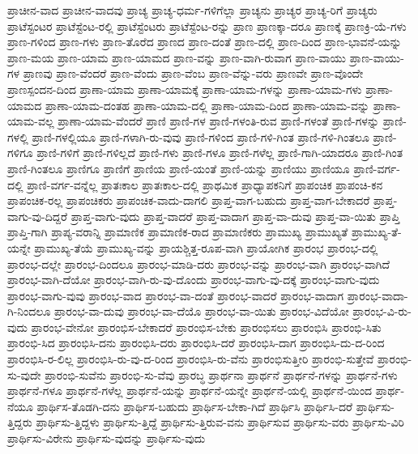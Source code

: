 {ಪ್ರಾಚೀನ-ವಾದ
ಪ್ರಾಚೀನ-ವಾದವು
ಪ್ರಾಚ್ಯ
ಪ್ರಾಚ್ಯ-ಧರ್ಮ-ಗಳಿಗೆಲ್ಲಾ
ಪ್ರಾಚ್ಯನು
ಪ್ರಾಚ್ಯರ
ಪ್ರಾಚ್ಯ-ರಿಗೆ
ಪ್ರಾಚ್ಯರು
ಪ್ರಾಟೆಸ್ಟಂಟರ
ಪ್ರಾಟೆಸ್ಟೆಂಟ-ರಲ್ಲಿ
ಪ್ರಾಟೆಸ್ಟೆಂಟರು
ಪ್ರಾಟೆಸ್ಟೆಂಟ-ರನ್ನು
ಪ್ರಾಣ
ಪ್ರಾಣಕ್ಕಾ-ದರೂ
ಪ್ರಾಣಕ್ಕೆ
ಪ್ರಾಣಕ್ರಿ-ಯೆ-ಗಳು
ಪ್ರಾಣ-ಗಳಿಂದ
ಪ್ರಾಣ-ಗಳು
ಪ್ರಾಣ-ತೊರೆದ
ಪ್ರಾಣದ
ಪ್ರಾಣ-ದಂತೆ
ಪ್ರಾಣ-ದಲ್ಲಿ
ಪ್ರಾಣ-ದಿಂದ
ಪ್ರಾಣ-ಭಾವನೆ-ಯನ್ನು
ಪ್ರಾಣ-ಮಯ
ಪ್ರಾಣ-ಯಾಮ
ಪ್ರಾಣ-ಯಾಮದ
ಪ್ರಾಣ-ವನ್ನು
ಪ್ರಾಣ-ವಾಗಿ-ರುವಾಗ
ಪ್ರಾಣ-ವಾಯು
ಪ್ರಾಣ-ವಾಯು-ಗಳ
ಪ್ರಾಣವು
ಪ್ರಾಣ-ವೆಂದರೆ
ಪ್ರಾಣ-ವೆಂದು
ಪ್ರಾಣ-ವೆಂಬ
ಪ್ರಾಣ-ವೆನ್ನು-ವರು
ಪ್ರಾಣವೇ
ಪ್ರಾಣ-ವೊಂದೇ
ಪ್ರಾಣಸ್ಪಂದನ-ದಿಂದ
ಪ್ರಾಣಾ-ಯಾಮ
ಪ್ರಾಣಾ-ಯಾಮಕ್ಕೆ
ಪ್ರಾಣಾ-ಯಾಮ-ಗಳನ್ನು
ಪ್ರಾಣಾ-ಯಾಮ-ಗಳು
ಪ್ರಾಣಾ-ಯಾಮದ
ಪ್ರಾಣಾ-ಯಾಮ-ದಂತಹ
ಪ್ರಾಣಾ-ಯಾಮ-ದಲ್ಲಿ
ಪ್ರಾಣಾ-ಯಾಮ-ದಿಂದ
ಪ್ರಾಣಾ-ಯಾಮ-ವನ್ನು
ಪ್ರಾಣಾ-ಯಾಮ-ವಲ್ಲ
ಪ್ರಾಣಾ-ಯಾಮ-ವೆಂದರೆ
ಪ್ರಾಣಿ
ಪ್ರಾಣಿ-ಗಳ
ಪ್ರಾಣಿ-ಗಳಂತಿ-ರುವ
ಪ್ರಾಣಿ-ಗಳಂತೆ
ಪ್ರಾಣಿ-ಗಳನ್ನು
ಪ್ರಾಣಿ-ಗಳಲ್ಲಿ
ಪ್ರಾಣಿ-ಗಳಲ್ಲಿಯೂ
ಪ್ರಾಣಿ-ಗಳಾಗಿ-ರು-ವುವು
ಪ್ರಾಣಿ-ಗಳಿಂದ
ಪ್ರಾಣಿ-ಗಳಿ-ಗಿಂತ
ಪ್ರಾಣಿ-ಗಳಿ-ಗಿಂತಲೂ
ಪ್ರಾಣಿ-ಗಳಿಗೂ
ಪ್ರಾಣಿ-ಗಳಿಗೆ
ಪ್ರಾಣಿ-ಗಳಿಲ್ಲದೆ
ಪ್ರಾಣಿ-ಗಳು
ಪ್ರಾಣಿ-ಗಳೂ
ಪ್ರಾಣಿ-ಗಳೆಲ್ಲ
ಪ್ರಾಣಿ-ಗಾಗಿ-ಯಾದರೂ
ಪ್ರಾಣಿ-ಗಿಂತ
ಪ್ರಾಣಿ-ಗಿಂತಲೂ
ಪ್ರಾಣಿಗೂ
ಪ್ರಾಣಿಗೆ
ಪ್ರಾಣಿಯ
ಪ್ರಾಣಿ-ಯಂತೆ
ಪ್ರಾಣಿ-ಯನ್ನು
ಪ್ರಾಣಿಯು
ಪ್ರಾಣಿಯೂ
ಪ್ರಾಣಿ-ವರ್ಗ-ದಲ್ಲಿ
ಪ್ರಾಣಿ-ವರ್ಗ-ವನ್ನೆಲ್ಲ
ಪ್ರಾತಃಕಾಲ
ಪ್ರಾತಃಕಾಲ-ದಲ್ಲಿ
ಪ್ರಾಥಮಿಕ
ಪ್ರಾಧ್ಯಾಪಕನಿಗೆ
ಪ್ರಾಪಂಚಿಕ
ಪ್ರಾಪಂಚಿ-ಕನ
ಪ್ರಾಪಂಚಿಕ-ರಲ್ಲ
ಪ್ರಾಪಂಚಿಕರು
ಪ್ರಾಪಂಚಿಕ-ವಾದು-ದಾಗಲಿ
ಪ್ರಾಪ್ತ-ವಾಗ-ಬಹುದು
ಪ್ರಾಪ್ತ-ವಾಗ-ಬೇಕಾದರೆ
ಪ್ರಾಪ್ತ-ವಾಗು-ವು-ದಿದ್ದರೆ
ಪ್ರಾಪ್ತ-ವಾಗು-ವುದು
ಪ್ರಾಪ್ತ-ವಾದರೆ
ಪ್ರಾಪ್ತ-ವಾದಾಗ
ಪ್ರಾಪ್ತ-ವಾ-ದುವು
ಪ್ರಾಪ್ತ-ವಾ-ಯಿತು
ಪ್ರಾಪ್ತಿ
ಪ್ರಾಪ್ತಿ-ಗಾಗಿ
ಪ್ರಾಪ್ಯ-ವರಾನ್ನಿ
ಪ್ರಾಮಾಣಿಕ
ಪ್ರಾಮಾಣಿಕ-ರಾದ
ಪ್ರಾಮಾಣಿಕರು
ಪ್ರಾಮುಖ್ಯ
ಪ್ರಾಮುಖ್ಯತೆ
ಪ್ರಾಮುಖ್ಯ-ತೆ-ಯನ್ನೇ
ಪ್ರಾಮುಖ್ಯ-ತೆಯೆ
ಪ್ರಾಮುಖ್ಯ-ವನ್ನು
ಪ್ರಾಯಶ್ಚಿತ್ತ-ರೂಪ-ವಾಗಿ
ಪ್ರಾಯೋಗಿಕ
ಪ್ರಾರಂಭ
ಪ್ರಾರಂಭ-ದಲ್ಲಿ
ಪ್ರಾರಂಭ-ದಲ್ಲೇ
ಪ್ರಾರಂಭ-ದಿಂದಲೂ
ಪ್ರಾರಂಭ-ಮಾಡಿ-ದರು
ಪ್ರಾರಂಭ-ವನ್ನು
ಪ್ರಾರಂಭ-ವಾಗಿ
ಪ್ರಾರಂಭ-ವಾಗಿದೆ
ಪ್ರಾರಂಭ-ವಾಗಿ-ದೆಯೋ
ಪ್ರಾರಂಭ-ವಾಗಿ-ರು-ವು-ದೊಂದು
ಪ್ರಾರಂಭ-ವಾಗು-ವು-ದಕ್ಕೆ
ಪ್ರಾರಂಭ-ವಾಗು-ವುದು
ಪ್ರಾರಂಭ-ವಾಗು-ವುವು
ಪ್ರಾರಂಭ-ವಾದ
ಪ್ರಾರಂಭ-ವಾ-ದಂತೆ
ಪ್ರಾರಂಭ-ವಾದರೆ
ಪ್ರಾರಂಭ-ವಾದಾಗ
ಪ್ರಾರಂಭ-ವಾದಾ-ಗಿ-ನಿಂದಲೂ
ಪ್ರಾರಂಭ-ವಾ-ದುವು
ಪ್ರಾರಂಭ-ವಾ-ದೆಯೊ
ಪ್ರಾರಂಭ-ವಾ-ಯಿತು
ಪ್ರಾರಂಭ-ವಿದೆಯೋ
ಪ್ರಾರಂಭ-ವಿ-ರು-ವುದು
ಪ್ರಾರಂಭ-ವೇನೋ
ಪ್ರಾರಂಭಿಸ-ಬೇಕಾದರೆ
ಪ್ರಾರಂಭಿಸ-ಬೇಕು
ಪ್ರಾರಂಭಿಸಲು
ಪ್ರಾರಂಭಿಸಿ
ಪ್ರಾರಂಭಿ-ಸಿತು
ಪ್ರಾರಂಭಿ-ಸಿದ
ಪ್ರಾರಂಭಿಸಿ-ದನು
ಪ್ರಾರಂಭಿಸಿ-ದರು
ಪ್ರಾರಂಭಿಸಿ-ದರೆ
ಪ್ರಾರಂಭಿಸಿ-ದಾಗ
ಪ್ರಾರಂಭಿಸಿ-ದು-ದ-ರಿಂದ
ಪ್ರಾರಂಭಿಸಿ-ರ-ಲಿಲ್ಲ
ಪ್ರಾರಂಭಿಸಿ-ರು-ವು-ದ-ರಿಂದ
ಪ್ರಾರಂಭಿಸಿ-ರು-ವೆನು
ಪ್ರಾರಂಭಿಸುತ್ತೀರಿ
ಪ್ರಾರಂಭಿ-ಸುತ್ತೇವೆ
ಪ್ರಾರಂಭಿ-ಸು-ವುದೇ
ಪ್ರಾರಂಭಿ-ಸುವೆನು
ಪ್ರಾರಂಭಿ-ಸು-ವೆವು
ಪ್ರಾರಬ್ಧ
ಪ್ರಾರ್ಥನಾ
ಪ್ರಾರ್ಥನೆ
ಪ್ರಾರ್ಥನೆ-ಗಳನ್ನು
ಪ್ರಾರ್ಥನೆ-ಗಳು
ಪ್ರಾರ್ಥನೆ-ಗಳೂ
ಪ್ರಾರ್ಥನೆ-ಗಳೆಲ್ಲ
ಪ್ರಾರ್ಥನೆ-ಯನ್ನು
ಪ್ರಾರ್ಥನೆ-ಯನ್ನೇ
ಪ್ರಾರ್ಥನೆ-ಯಲ್ಲಿ
ಪ್ರಾರ್ಥನೆ-ಯಿಂದ
ಪ್ರಾರ್ಥ-ನೆಯೂ
ಪ್ರಾರ್ಥಿಸ-ತೊಡಗಿ-ದನು
ಪ್ರಾರ್ಥಿಸ-ಬಹುದು
ಪ್ರಾರ್ಥಿಸ-ಬೇಕಾ-ಗಿದೆ
ಪ್ರಾರ್ಥಿಸಿ
ಪ್ರಾರ್ಥಿಸಿ-ದರೆ
ಪ್ರಾರ್ಥಿಸು-ತ್ತಿದ್ದರು
ಪ್ರಾರ್ಥಿಸು-ತ್ತಿದ್ದಳು
ಪ್ರಾರ್ಥಿಸು-ತ್ತಿದ್ದೆ
ಪ್ರಾರ್ಥಿಸು-ತ್ತಿರುವ-ವನು
ಪ್ರಾರ್ಥಿಸುವ
ಪ್ರಾರ್ಥಿಸು-ವರು
ಪ್ರಾರ್ಥಿಸು-ವಿರಿ
ಪ್ರಾರ್ಥಿಸು-ವಿರೇನು
ಪ್ರಾರ್ಥಿಸು-ವುದನ್ನು
ಪ್ರಾರ್ಥಿಸು-ವುದು
}
